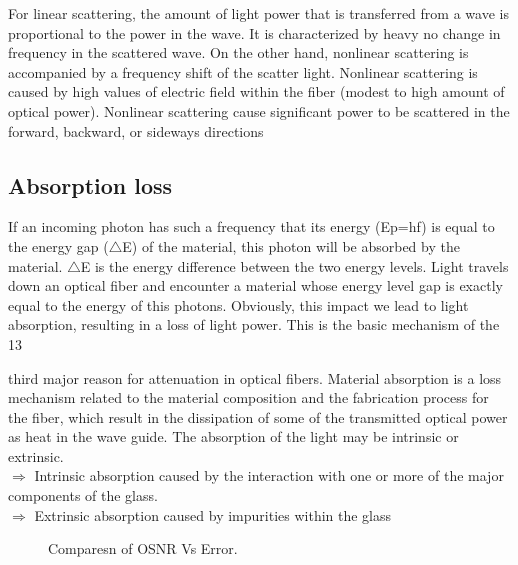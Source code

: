 \documentclass[12pt]{report}
\begin{document}
	For linear scattering, the amount of light power that is transferred from a wave is proportional to the power in the wave. It is characterized by heavy no change in frequency in the scattered wave. On the other hand, nonlinear scattering is accompanied by a frequency shift of the scatter light. Nonlinear scattering is caused by high values of electric field within the fiber (modest to high amount of optical power). Nonlinear scattering cause significant power to be scattered in the forward, backward, or sideways directions
	
	\subsection{Absorption loss}
	If an incoming photon has such a frequency that its energy (Ep=hf) is equal to the energy gap ($\bigtriangleup$E) of the material, this photon will be absorbed by the material. $\bigtriangleup$E is the energy difference between the two energy levels. Light travels down an optical fiber and encounter a material whose energy level gap is exactly equal to the energy of this photons. Obviously, this impact we lead to light absorption, resulting in a loss of light power. This is the basic mechanism of the 
	13 
	
	third major reason for attenuation in optical fibers. Material absorption is a loss mechanism related to the material composition and the fabrication process for the fiber, which result in the dissipation of some of the transmitted optical power as heat in the wave guide. The absorption of the light may be intrinsic or extrinsic.\\
	$\Rightarrow$ Intrinsic absorption caused by the interaction with one or more of the major components of the glass.\\ $\Rightarrow$ Extrinsic absorption caused by impurities within the glass\\     
	\begin{figure}[htbp]
		\caption{Comparesn of OSNR Vs Error.}
		\label{fig1}
	\end{figure}
\end{document}
